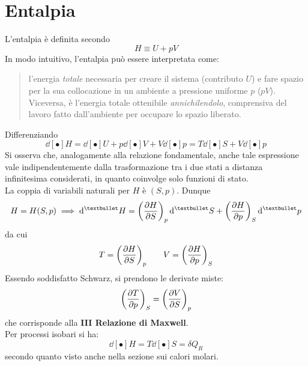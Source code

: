 \documentclass[10pt, oneside]{book}
\begin{document}
\section{Entalpia}
L'entalpia è definita secondo
\[H \equiv U + pV\]
In modo intuitivo, l'entalpia può essere interpretata come:
\begin{quote}
l'energia \textit{totale} necessaria per creare il sistema (contributo $U$) e fare spazio per la sua collocazione in un ambiente a pressione uniforme $p$ ($pV$).\\
Viceversa, è l'energia totale ottenibile \textit{annichilendolo}, comprensiva del lavoro fatto dall'ambiente per occupare lo spazio liberato.
\end{quote}
Differenziando
\[\dd[•]{H} = \dd[•]{U} + p \dd[•]{V} + V \dd[•]{p} = T \dd[•]{S} + V \dd[•]{p}\]
Si osserva che, analogamente alla relazione fondamentale, anche tale espressione vale indipendentemente dalla trasformazione tra i due stati a distanza infinitesima considerati, in quanto coinvolge solo funzioni di stato.\\
La coppia di variabili naturali per $H$ è $(S,p)$. Dunque
\[H = H(S,p) \implies \dd[•]{H} = \bigg(\pdv{H}{S}\bigg)_p \dd[•]{S} + \bigg(\pdv{H}{p}\bigg)_S \dd[•]{p}\]
da cui
\[T = \bigg(\pdv{H}{S}\bigg)_p \qquad V = \bigg(\pdv{H}{p}\bigg)_S\]
Essendo soddisfatto Schwarz, si prendono le derivate miste:
\[\bigg(\pdv{T}{p}\bigg)_S = \bigg(\pdv{V}{S}\bigg)_p\]
che corrisponde alla \textbf{III Relazione di Maxwell}.\\
Per processi isobari si ha:
\[\dd[•]{H} = T \dd[•]{S} = \delta Q_R\]
secondo quanto visto anche nella sezione sui calori molari.
\end{document}
